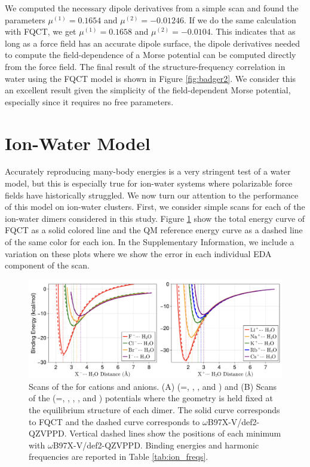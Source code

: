 \documentclass[journal=jctcce,manuscript=article]{achemso}
\begin{document}
We computed the necessary dipole derivatives from a simple  scan and found the parameters $\mu^{(1)}=0.1654$ and $\mu^{(2)}=-0.01246$. If we do the same calculation with FQCT, we get $\mu^{(1)}=0.1658$ and $\mu^{(2)}=-0.0104$. This indicates that as long as a force field has an accurate dipole surface, the dipole derivatives needed to compute the field-dependence of a Morse potential can be computed directly from the force field. The final result of the structure-frequency correlation in water using the FQCT model is shown in Figure \ref{fig:badger2}. We consider this an excellent result given the simplicity of the field-dependent Morse potential, especially since it requires no free parameters. 

\section*{Ion-Water Model}
Accurately reproducing many-body energies is a very stringent test of a water model, but this is especially true for ion-water systems where polarizable force fields have historically struggled. We now turn our attention to the performance of this model on ion-water clusters. First, we consider simple scans for each of the ion-water dimers considered in this study. Figure \ref{fig:ion_scans} show the total energy curve of FQCT as a solid colored line and the QM reference energy curve as a dashed line of the same color for each ion. In the Supplementary Information, we include a variation on these plots where we show the error in each individual EDA component of the scan.
\begin{figure}[h]
  \includegraphics*[width=\textwidth]{figures/anion-cation_dimer_scans.png}
  \caption{Scans of the  for cations and anions. (A) (=, , , and ) and (B) Scans of the  (=, , , , and )
  potentials where the geometry is held fixed at the equilibrium structure of each dimer.
  The solid curve corresponds to FQCT and the dashed curve corresponds to $\omega$B97X-V/def2-QZVPPD.
  Vertical dashed lines show the positions of each minimum with $\omega$B97X-V/def2-QZVPPD.
  Binding energies and harmonic frequencies are reported in Table \ref{tab:ion_freqs}.
  }\label{fig:ion_scans}
\end{figure}
\end{document}
